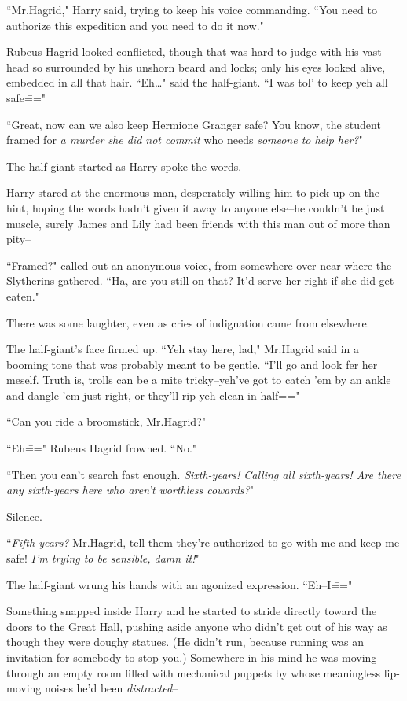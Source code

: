 ``Mr.\?Hagrid," Harry said, trying to keep his voice commanding. ``You need to authorize this expedition and you need to do it now."

Rubeus Hagrid looked conflicted, though that was hard to judge with his vast head so surrounded by his unshorn beard and locks; only his eyes looked alive, embedded in all that hair. ``Eh{\ldots}" said the half-giant. ``I was tol' to keep yeh all safe\==="

``Great, now can we also keep Hermione Granger safe? You know, the student framed for \emph{a murder she did not commit} who needs \emph{someone to help her?}"

The half-giant started as Harry spoke the words.

Harry stared at the enormous man, desperately willing him to pick up on the hint, hoping the words hadn't given it away to anyone else\---he couldn't be just muscle, surely James and Lily had been friends with this man out of more than pity\---

``Framed?" called out an anonymous voice, from somewhere over near where the Slytherins gathered. ``Ha, are you still on that? It'd serve her right if she did get eaten."

There was some laughter, even as cries of indignation came from elsewhere.

The half-giant's face firmed up. ``Yeh stay here, lad," Mr.\?Hagrid said in a booming tone that was probably meant to be gentle. ``I'll go and look fer her meself. Truth is, trolls can be a mite tricky\---yeh've got to catch 'em by an ankle and dangle 'em just right, or they'll rip yeh clean in half\==="

``Can you ride a broomstick, Mr.\?Hagrid?"

``Eh\===" Rubeus Hagrid frowned. ``No."

``Then you can't search fast enough. \emph{Sixth-years! Calling all sixth-years! Are there any sixth-years here who aren't worthless cowards?}"

Silence.

``\emph{Fifth years?} Mr.\?Hagrid, tell them they're authorized to go with me and keep me safe! \emph{I'm trying to be sensible, damn it!}"

The half-giant wrung his hands with an agonized expression. ``Eh\---I\==="

Something snapped inside Harry and he started to stride directly toward the doors to the Great Hall, pushing aside anyone who didn't get out of his way as though they were doughy statues. (He didn't run, because running was an invitation for somebody to stop you.) Somewhere in his mind he was moving through an empty room filled with mechanical puppets by whose meaningless lip-moving noises he'd been \emph{distracted}\---

